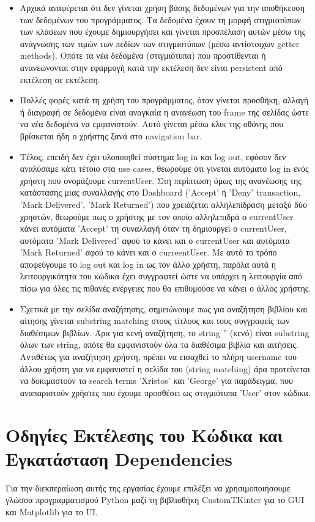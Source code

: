 \documentclass[12pt,a4paper]{article}
\begin{document}
\begin{itemize}
    \item Αρχικά αναφέρεται ότι δεν γίνεται χρήση βάσης δεδομένων για την αποθήκευση των δεδομένων του προγράμματος. Τα δεδομένα έχουν τη μορφή στιγμιοτύπων των κλάσεων που έχουμε δημιουργήσει και γίνεται προσπέλαση αυτών μέσω της ανάγνωσης των τιμών των πεδίων των στιγμιοτύπων (μέσω αντίστοιχων getter methods). Οπότε τα νέα δεδομένα (στιγμιότυπα) που προστίθενται ή ανανεώνονται στην εφαρμογή κατά την εκτέλεση δεν είναι persistent από εκτέλεση σε εκτέλεση.
    \item Πολλές φορές κατά τη χρήση του προγράμματος, όταν γίνεται προσθήκη, αλλαγή ή διαγραφή σε δεδομένα είναι αναγκαία η ανανέωση του frame της σελίδας ώστε να νέα δεδομένα να εμφανιστούν. Αυτό γίνεται μέσω κλικ της οθόνης που βρίσκεται ήδη ο χρήστης ξανά στο navigation bar.
    \item Τέλος, επειδή δεν έχει υλοποιηθεί σύστημα log in και log out, εφόσον δεν αναλύσαμε κάτι τέτοιο στα use cases, θεωρούμε ότι γίνεται αυτόματο log in ενός χρήστη που ονομάζουμε currentUser. Στη περίπτωση όμως της ανανέωσης της κατάστασης μιας συναλλαγής στο Dashboard ('Accept' ή 'Deny' transaction, 'Mark Delivered', 'Mark Returned') που χρειάζεται αλληλεπίδραση μεταξύ δύο χρηστών, θεωρούμε πως ο χρήστης με τον οποίο αλληλεπιδρά ο currentUser κάνει αυτόματα 'Accept' τη συναλλαγή όταν τη δημιουργεί ο currentUser, αυτόματα 'Mark Delivered' αφού το κάνει και ο currentUser και αυτόματα 'Mark Returned' αφού το κάνει και ο curreentUser. Με αυτό το τρόπο αποφεύγουμε το log out και log in ως τον άλλο χρήστη, παρόλα αυτά η λειτουργικότητα του κώδικα έχει συγγραφτεί ώστε να υπάρχει η λειτουργία από πίσω για όλες τις πιθανές ενέργειες που θα επιθυμούσε να κάνει ο άλλος χρήστης.
    \item Σχετικά με την σελίδα αναζήτησης, σημειώνουμε πως για αναζήτηση βιβλίου και αίτησης γίνεται substring matching στους τίτλους και τους συγγραφείς των διαθέσιμων βιβλίων. Άρα για κενή αναζήτηση, το string '' (κενό) είναι substring όλων των string, οπότε θα εμφανιστούν όλα τα διαθέσιμα βιβλία και αιτήσεις. Αντιθέτως για αναζήτηση χρήστη, πρέπει να εισαχθεί το πλήρη username του άλλου χρήστη για να εμφανιστεί η σελίδα του (string matching) άρα προτείνεται να δοκιμαστούν τα search terms 'Xristos' και 'George' για παράδειγμα, που αναπαριστούν χρήστες που έχουμε προσθέσει ως στιγμιότυπα 'User' στον κώδικα.
\end{itemize}

\section{Οδηγίες Εκτέλεσης του Κώδικα και Εγκατάσταση Dependencies}
Για την διεκπεραίωση αυτής της εργασίας έχουμε επιλέξει να χρησιμοποιήσουμε γλώσσα προγραμματισμού Python μαζί τη βιβλιοθήκη CustomTKinter για το GUI και Matplotlib για το UI.
\end{document}
